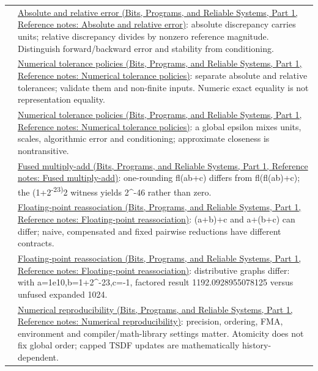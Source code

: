 {\begin{longtable}[]{@{}
  >{\raggedright\arraybackslash}p{}
  >{\raggedright\arraybackslash}p{}@{}}
82 & \href{../01-Bits-Programs-and-Reliable-Systems-P01/main.pdf\#nameddest=appendix-3ae74e89b4e6}{Absolute and relative error (Bits, Programs, and Reliable Systems, Part 1, Reference notes: Absolute and relative error)}: absolute discrepancy carries units; relative discrepancy divides by nonzero reference magnitude. Distinguish forward/backward error and stability from conditioning. \\
83 & \href{../01-Bits-Programs-and-Reliable-Systems-P01/main.pdf\#nameddest=appendix-0ec599f8ba27}{Numerical tolerance policies (Bits, Programs, and Reliable Systems, Part 1, Reference notes: Numerical tolerance policies)}: separate absolute and relative tolerances; validate them and non-finite inputs. Numeric exact equality is not representation equality. \\
84 & \href{../01-Bits-Programs-and-Reliable-Systems-P01/main.pdf\#nameddest=appendix-0ec599f8ba27}{Numerical tolerance policies (Bits, Programs, and Reliable Systems, Part 1, Reference notes: Numerical tolerance policies)}: a global epsilon mixes units, scales, algorithmic error and conditioning; approximate closeness is nontransitive. \\
85 & \href{../01-Bits-Programs-and-Reliable-Systems-P01/main.pdf\#nameddest=appendix-41e8ef22a21e}{Fused multiply-add (Bits, Programs, and Reliable Systems, Part 1, Reference notes: Fused multiply-add)}: one-rounding fl(ab+c) differs from fl(fl(ab)+c); the (1+2\textsuperscript{-23)}2 witness yields 2\^{}-46 rather than zero. \\
86 & \href{../01-Bits-Programs-and-Reliable-Systems-P01/main.pdf\#nameddest=appendix-c2ac4a84c283}{Floating-point reassociation (Bits, Programs, and Reliable Systems, Part 1, Reference notes: Floating-point reassociation)}: (a+b)+c and a+(b+c) can differ; naive, compensated and fixed pairwise reductions have different contracts. \\
87 & \href{../01-Bits-Programs-and-Reliable-Systems-P01/main.pdf\#nameddest=appendix-c2ac4a84c283}{Floating-point reassociation (Bits, Programs, and Reliable Systems, Part 1, Reference notes: Floating-point reassociation)}: distributive graphs differ: with a=1e10,b=1+2\^{}-23,c=-1, factored result 1192.0928955078125 versus unfused expanded 1024. \\
88 & \href{../01-Bits-Programs-and-Reliable-Systems-P01/main.pdf\#nameddest=appendix-5f1a2c3f97ff}{Numerical reproducibility (Bits, Programs, and Reliable Systems, Part 1, Reference notes: Numerical reproducibility)}: precision, ordering, FMA, environment and compiler/math-library settings matter. Atomicity does not fix global order; capped TSDF updates are mathematically history-dependent. \\
\end{longtable}
}

